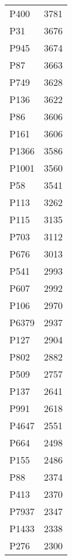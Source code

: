 \begin{tabular}{lr}
    P400 &                         3781 \\
     P31 &                         3676 \\
    P945 &                         3674 \\
     P87 &                         3663 \\
    P749 &                         3628 \\
    P136 &                         3622 \\
     P86 &                         3606 \\
    P161 &                         3606 \\
   P1366 &                         3586 \\
   P1001 &                         3560 \\
     P58 &                         3541 \\
    P113 &                         3262 \\
    P115 &                         3135 \\
    P703 &                         3112 \\
    P676 &                         3013 \\
    P541 &                         2993 \\
    P607 &                         2992 \\
    P106 &                         2970 \\
   P6379 &                         2937 \\
    P127 &                         2904 \\
    P802 &                         2882 \\
    P509 &                         2757 \\
    P137 &                         2641 \\
    P991 &                         2618 \\
   P4647 &                         2551 \\
    P664 &                         2498 \\
    P155 &                         2486 \\
     P88 &                         2374 \\
    P413 &                         2370 \\
   P7937 &                         2347 \\
   P1433 &                         2338 \\
    P276 &                         2300 \\

\end{tabular}
